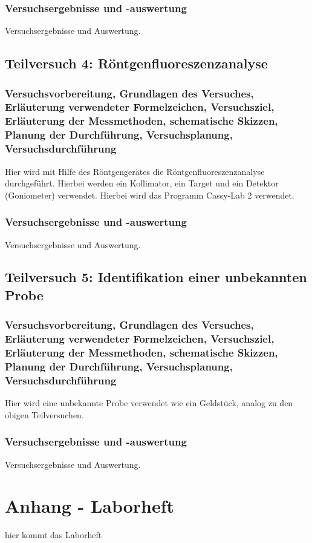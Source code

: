 \documentclass[12pt,oneside,oldfontcommands]{memoir}
\begin{document}
\subsubsection{Versuchsergebnisse und -auswertung}
Versuchsergebnisse und Auswertung.

\subsection{Teilversuch 4: Röntgenfluoreszenzanalyse}
\subsubsection{Versuchsvorbereitung, Grundlagen des Versuches, Erläuterung verwendeter Formelzeichen, Versuchsziel, Erläuterung der Messmethoden, schematische Skizzen, Planung der Durchführung, Versuchsplanung, Versuchsdurchführung}
Hier wird mit Hilfe des Röntgengerätes die Röntgenfluoreszenzanalyse durchgeführt. Hierbei werden ein Kollimator, ein Target und ein Detektor (Goniometer) verwendet. Hierbei wird das Programm Cassy-Lab 2 verwendet.
\subsubsection{Versuchsergebnisse und -auswertung}
Versuchsergebnisse und Auswertung.

\subsection{Teilversuch 5: Identifikation einer unbekannten Probe}
\subsubsection{Versuchsvorbereitung, Grundlagen des Versuches, Erläuterung verwendeter Formelzeichen, Versuchsziel, Erläuterung der Messmethoden, schematische Skizzen, Planung der Durchführung, Versuchsplanung, Versuchsdurchführung}
Hier wird eine unbekannte Probe verwendet wie ein Geldstück, analog zu den obigen Teilversuchen.

\subsubsection{Versuchsergebnisse und -auswertung}
Versuchsergebnisse und Auswertung.


\section{Anhang - Laborheft}

hier kommt das Laborheft
\end{document}
